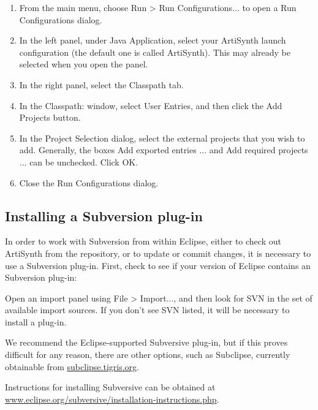\begin{enumerate}

\item From the main menu, choose {\sf Run > Run Configurations...}
to open a {\sf Run Configurations} dialog.

\item In the left panel, under {\sf Java Application}, select your
ArtiSynth launch configuration (the default one is called {\sf
ArtiSynth}). This may already be selected when you open the panel.

\item In the right panel, select the {\sf Classpath} tab.

\item In the {\sf Classpath:} window, select {\sf User Entries},
and then click the {\sf Add Projects} button.

\item In the {\sf Project Selection} dialog, select the external
projects that you wish to add. Generally, the boxes
{\sf Add exported entries ...} and {\sf Add required projects ...}
can be unchecked. Click {\sf OK}.

\item Close the {\sf Run Configurations} dialog.

\end{enumerate}

\subsection{Installing a Subversion plug-in}
\label{SubversionPlugIn}

In order to work with Subversion from within Eclipse, either to check
out ArtiSynth from the repository, or to update or commit changes, it
is necessary to use a Subversion plug-in. First, check to see if your
version of Eclipse contains an Subversion plug-in:

Open an import panel using {\sf File > Import...}, and then look for
{\sf SVN} in the set of available import sources. If you don't see SVN
listed, it will be necessary to install a plug-in.

We recommend the Eclipse-supported Subversive plug-in, but if this
proves difficult for any reason, there are other options, such as
Subclipse, currently obtainable from
\href{http://subclipse.tigris.org/servlets/ProjectProcess?pageID=p4wYuA}%
{subclipse.tigris.org}.

Instructions for installing Subversive can be obtained at
\href{http://www.eclipse.org/subversive/installation-instructions.php}%
{www.eclipse.org/subversive/installation-instructions.php}.

